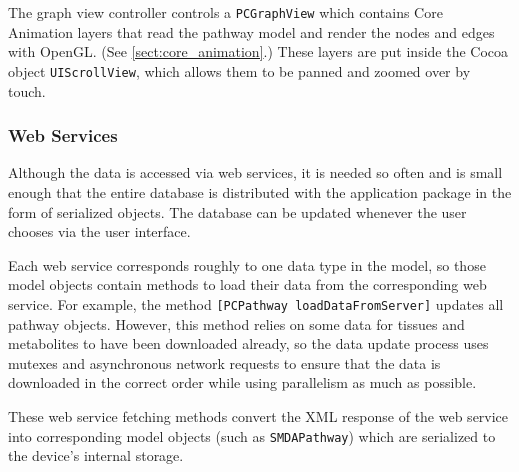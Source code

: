 The graph view controller controls a \texttt{PCGraphView} which contains Core
Animation layers that read the pathway model and render the nodes and edges with
OpenGL. (See \ref{sect:core_animation}.) These layers are put inside the
Cocoa object \texttt{UIScrollView}, which allows them to be panned and zoomed
over by touch.

\subsubsection{Web Services}
\label{sect:maw_web_services}

Although the data is accessed via web services, it is needed so often and is
small enough that the entire database is distributed with the application
package in the form of serialized objects. The database can be updated whenever
the user chooses via the user interface.

Each web service corresponds roughly to one data type in the model, so those
model objects contain methods to load their data from the corresponding web
service. For example, the method \texttt{[PCPathway loadDataFromServer]}
updates all pathway objects. However, this method relies on some data for
tissues and metabolites to have been downloaded already, so the data update
process uses mutexes and asynchronous network requests to ensure that the data
is downloaded in the correct order while using parallelism as much as possible.

These web service fetching methods convert the XML response of the web service
into corresponding model objects (such as \texttt{SMDAPathway}) which are
serialized to the device's internal storage.


